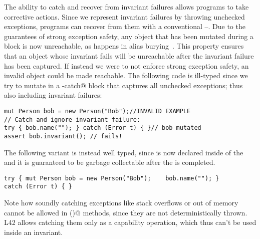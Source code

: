The ability to catch and recover from invariant failures allows programs to take corrective actions.
Since we represent invariant failures by throwing unchecked exceptions, programs can recover from them with a conventional \Q@try@--\Q@catch@.
	Due to the guarantees of strong exception safety, any object that has been mutated during a \Q@try@ block is now unreachable, as happens in alias burying~\cite{boyland2001alias}.
 This property ensures that an object whose invariant fails will be unreachable after the invariant failure has been captured. %
If instead we were to not enforce strong exception safety, an invalid object could be made reachable.
The following code is ill-typed since we try to mutate \Q@bob@ in a \Q@try-catch@ block that captures all unchecked exceptions; thus also including invariant failures:
\begin{lstlisting}[morekeywords={assert}]
mut Person bob = new Person("Bob");//INVALID EXAMPLE
// Catch and ignore invariant failure:
try { bob.name(""); } catch (Error t) { }// bob mutated
assert bob.invariant(); // fails!
\end{lstlisting}
The following variant is instead well typed, since \Q@bob@ is now declared inside of the \Q@try@ and it is guaranteed to be garbage collectable after the \Q@try@ is completed.
\begin{lstlisting}[morekeywords={assert}]
try { mut Person bob = new Person("Bob");    bob.name(""); } 
catch (Error t) { }
\end{lstlisting}

Note how soundly catching exceptions like stack overflows or out of memory cannot be allowed in \Q@invariant()@ methods, since they are not deterministically thrown.
L42 allows catching them only as a capability operation, which thus can't be used inside an invariant.

